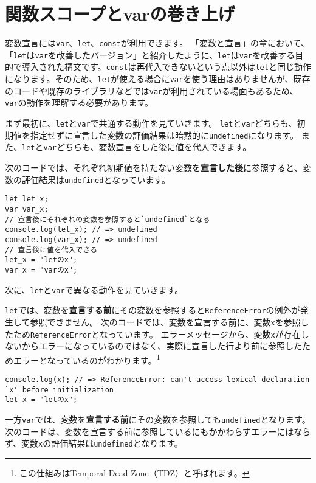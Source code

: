 \hypertarget{hoisting-var}{%
\section{関数スコープとvarの巻き上げ}\label{hoisting-var}}

変数宣言には\texttt{var}、\texttt{let}、\texttt{const}が利用できます。
「\href{../variables/README.md}{変数と宣言}」の章において、「\texttt{let}は\texttt{var}を改善したバージョン」と紹介したように、\texttt{let}は\texttt{var}を改善する目的で導入された構文です。\texttt{const}は再代入できないという点以外は\texttt{let}と同じ動作になります。そのため、\texttt{let}が使える場合に\texttt{var}を使う理由はありませんが、既存のコードや既存のライブラリなどでは\texttt{var}が利用されている場面もあるため、\texttt{var}の動作を理解する必要があります。

まず最初に、\texttt{let}と\texttt{var}で共通する動作を見ていきます。
\texttt{let}と\texttt{var}どちらも、初期値を指定せずに宣言した変数の評価結果は暗黙的に\texttt{undefined}になります。
また、\texttt{let}と\texttt{var}どちらも、変数宣言をした後に値を代入できます。

次のコードでは、それぞれ初期値を持たない変数を\textbf{宣言した後}に参照すると、変数の評価結果は\texttt{undefined}となっています。

\begin{lstlisting}
let let_x;
var var_x;
// 宣言後にそれぞれの変数を参照すると`undefined`となる
console.log(let_x); // => undefined
console.log(var_x); // => undefined
// 宣言後に値を代入できる
let_x = "letのx";
var_x = "varのx";
\end{lstlisting}

次に、\texttt{let}と\texttt{var}で異なる動作を見ていきます。

\texttt{let}では、変数を\textbf{宣言する前}にその変数を参照すると\texttt{ReferenceError}の例外が発生して参照できません。
次のコードでは、変数を宣言する前に、変数\texttt{x}を参照したため\texttt{ReferenceError}となっています。
エラーメッセージから、変数\texttt{x}が存在しないからエラーになっているのではなく、実際に宣言した行より前に参照したためエラーとなっているのがわかります。\footnote{この仕組みはTemporal
  Dead Zone（TDZ）と呼ばれます。}

\begin{lstlisting}
console.log(x); // => ReferenceError: can't access lexical declaration `x' before initialization
let x = "letのx";
\end{lstlisting}

一方\texttt{var}では、変数を\textbf{宣言する前}にその変数を参照しても\texttt{undefined}となります。
次のコードは、変数を宣言する前に参照しているにもかかわらずエラーにはならず、変数\texttt{x}の評価結果は\texttt{undefined}となります。

